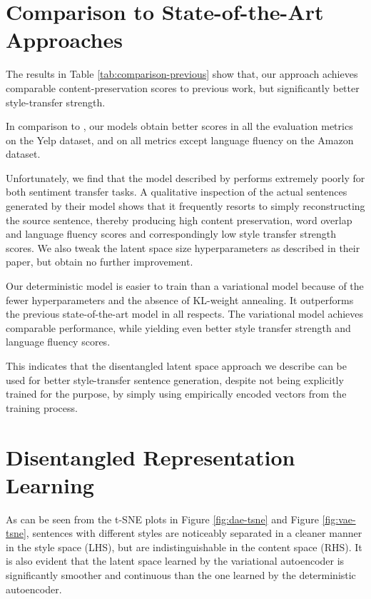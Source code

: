 \section{Comparison to State-of-the-Art Approaches}

The results in Table \ref{tab:comparison-previous} show that, our approach achieves comparable content-preservation scores to previous work, but significantly better style-transfer strength.

In comparison to \cite{shen2017style}, our models obtain better scores in all the evaluation metrics on the Yelp dataset, and on all metrics except language fluency on the Amazon dataset.

Unfortunately, we find that the model described by \cite{fu2017style} performs extremely poorly for both sentiment transfer tasks. A qualitative inspection of the actual sentences generated by their model shows that it frequently resorts to simply reconstructing the source sentence, thereby producing high content preservation, word overlap and language fluency scores and correspondingly low style transfer strength scores. We also tweak the latent space size hyperparameters as described in their paper, but obtain no further improvement.

Our deterministic model is easier to train than a variational model because of the fewer hyperparameters and the absence of KL-weight annealing. It outperforms the previous state-of-the-art model \citep{shen2017style} in all respects. The variational model achieves comparable performance, while yielding even better style transfer strength and language fluency scores.

This indicates that the disentangled latent space approach we describe can be used for better style-transfer sentence generation, despite not being explicitly trained for the purpose, by simply using empirically encoded vectors from the training process.


\section{Disentangled Representation Learning}

As can be seen from the t-SNE plots in Figure \ref{fig:dae-tsne} and Figure \ref{fig:vae-tsne}, sentences with different styles are noticeably separated in a cleaner manner in the style space (LHS), but are indistinguishable in the content space (RHS). It is also evident that the latent space learned by the variational autoencoder is significantly smoother and continuous than the one learned by the deterministic autoencoder.

